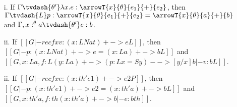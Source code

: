 \begin{lemma}[Inversion]
  \label{lemma:inversion}
  \begin{itemize}
  \item[i.] If $\Gamma \tvdash{\theta'} \lambda x.e:\arrowT{x}{\theta}{e_1}{+}{e_2}$, then 
    $\Gamma \tvdash{L} p:\arrowT{x}{\theta}{e_1}{+}{e_2} = \arrowT{x}{\theta}{a}{+}{b}$ and
    $\Gamma,x:^\theta a \tvdash{\theta'} e:b$.

  \item[ii.] If $[[G |- rec f x v : (x : L Nat) + -> e L]]$, then 
    $[[G |- p : (x : L Nat) + -> e = (x : L a) + -> b L]]$ and
    $[[G, x : L a, f : L (y : L a)+ -> (p : L x = S y)- -> [y/x]b |- v : b  L]]$.

  \item[ii.] If $[[G |- rec f x e : (x : th' e1) + -> e2 P]]$, then 
    $[[G |- p : (x : th' e1) + -> e2 = (x : th' a) + -> b L]]$ and
    $[[G, x : th' a, f : th (x : th' a)+ -> b |- e : b  th]]$.
    
  \end{itemize}
\end{lemma}
